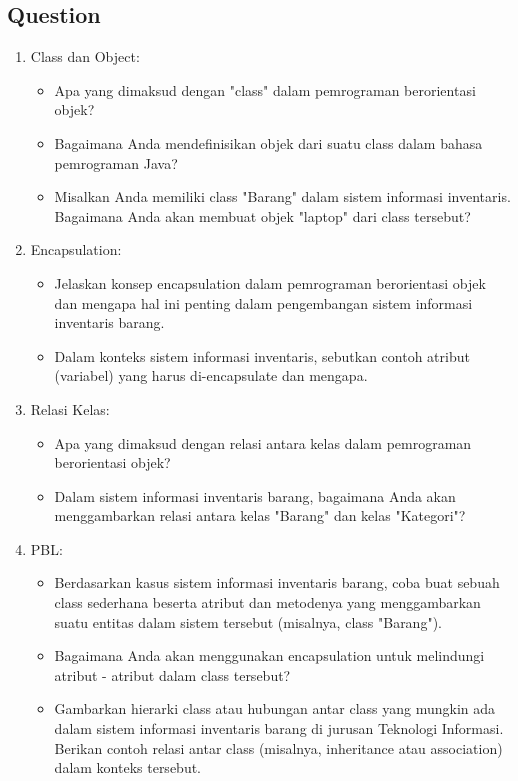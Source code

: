 \documentclass[12pt,titlepage]{article}
\begin{document}
\subsection{Question}
\begin{enumerate}
    \item Class dan Object:
    \begin{itemize}
        \item Apa yang dimaksud dengan "class" dalam pemrograman berorientasi objek?
        \item Bagaimana Anda mendefinisikan objek dari suatu class dalam bahasa pemrograman Java?
        \item Misalkan Anda memiliki class "Barang" dalam sistem informasi inventaris. Bagaimana Anda akan membuat objek "laptop" dari class tersebut? 
    \end{itemize}
    \item Encapsulation:
        \begin{itemize}
        \item Jelaskan konsep encapsulation dalam pemrograman berorientasi objek dan mengapa hal ini penting dalam pengembangan sistem informasi inventaris barang.
        \item Dalam konteks sistem informasi inventaris, sebutkan contoh atribut (variabel) yang harus di-encapsulate dan mengapa.
    \end{itemize}
    \item Relasi Kelas:
    \begin{itemize}
        \item Apa yang dimaksud dengan relasi antara kelas dalam pemrograman berorientasi objek?
        \item Dalam sistem informasi inventaris barang, bagaimana Anda akan menggambarkan relasi antara kelas "Barang" dan kelas "Kategori"?
    \end{itemize}
    \item PBL:
    \begin{itemize}
        \item Berdasarkan kasus sistem informasi inventaris barang, coba buat sebuah class sederhana beserta atribut dan metodenya yang menggambarkan suatu entitas dalam sistem tersebut (misalnya, class "Barang").
        \item Bagaimana Anda akan menggunakan encapsulation untuk melindungi atribut - atribut dalam class tersebut?
        \item Gambarkan hierarki class atau hubungan antar class yang mungkin ada dalam sistem informasi inventaris barang di jurusan Teknologi Informasi. Berikan contoh relasi antar class (misalnya, inheritance atau association) dalam konteks tersebut.
    \end{itemize}
\end{enumerate}
\end{document}
